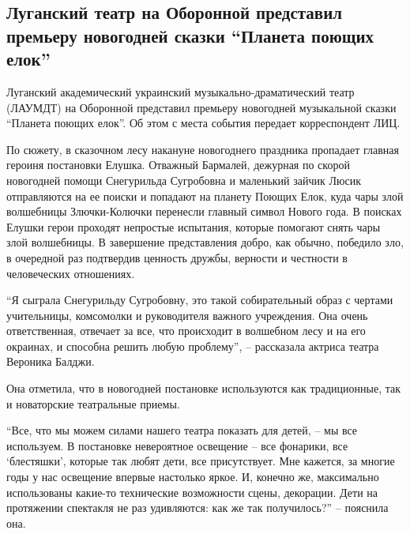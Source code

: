  
 
 
 
 
\subsection{Луганский театр на Оборонной представил премьеру новогодней сказки \enquote{Планета поющих елок}}
\label{sec:18_12_2021.stz.news.lnr.lug_info.2.skazka_premjera}


Луганский академический украинский музыкально-драматический театр (ЛАУМДТ) на
Оборонной представил премьеру новогодней музыкальной сказки \enquote{Планета поющих
елок}. Об этом с места события передает корреспондент ЛИЦ.

По сюжету, в сказочном лесу накануне новогоднего праздника пропадает главная
героиня постановки Елушка. Отважный Бармалей, дежурная по скорой новогодней
помощи Снегурильда Сугробовна и маленький зайчик Люсик отправляются на ее
поиски и попадают на планету Поющих Елок, куда чары злой волшебницы
Злючки-Колючки перенесли главный символ Нового года. В поисках Елушки герои
проходят непростые испытания, которые помогают снять чары злой волшебницы. В
завершение представления добро, как обычно, победило зло, в очередной раз
подтвердив ценность дружбы, верности и честности в человеческих отношениях.

\enquote{Я сыграла Снегурильду Сугробовну, это такой собирательный образ с чертами
учительницы, комсомолки и руководителя важного учреждения. Она очень
ответственная, отвечает за все, что происходит в волшебном лесу и на его
окраинах, и способна решить любую проблему}, – рассказала актриса театра
Вероника Балджи.

Она отметила, что в новогодней постановке используются как традиционные, так и
новаторские театральные приемы.

\enquote{Все, что мы можем силами нашего театра показать для детей, – мы все
используем. В постановке невероятное освещение – все фонарики, все \enquote{блестяшки},
которые так любят дети, все присутствует. Мне кажется, за многие годы у нас
освещение впервые настолько яркое. И, конечно же, максимально использованы
какие-то технические возможности сцены, декорации. Дети на протяжении спектакля
не раз удивляются: как же так получилось?} – пояснила она.

